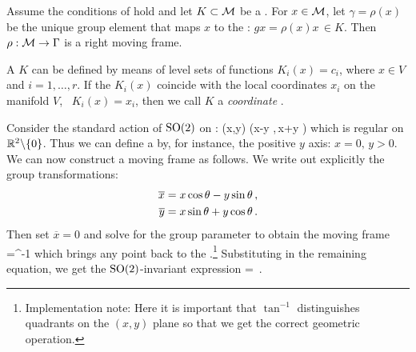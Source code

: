 \begin{theorem}
 Assume the conditions of  hold and
 let $K\subset\mathcal{M}$ be a {\csection}. For $x\in \mathcal{M}$, let
 $\gamma=\rho(x)$ be the unique group element that maps $x$
 to the {\csection}: $g x = \rho(x) x\, \in K$. Then
 $\rho:\mathcal{M}\rightarrow \Gamma$ is a right moving frame.
\end{theorem}

A {\csection} $K$ can be defined by means of level sets of
functions $K_i(x)=c_i$, where $x\in V$ and $i=1,\ldots,r$. If
the $K_i(x)$ coincide with the local coordinates $x_i$ on the
manifold $V$, \ie~$K_i(x)=x_i$, then we call $K$ a
\emph{coordinate \csection}.

\begin{example}
Consider the standard action of $\mathrm{SO}(2)$ on :
\beq
	(x,y) \mapsto (x\cos\theta -y \sin\theta,\,x\sin\theta +y \cos\theta )
\eeq
which is regular on $\mathbb{R}^{2}\backslash\{0\}$. Thus we can define
a {\csection} by, for instance, the
positive $y$ axis: $x=0,\,y>0$.
We can now construct a moving frame as follows. We write out
explicitly the group transformations:
\begin{subequations}
\begin{align}
 	\overline{x} &= x \cos\theta - y \sin\theta\label{eq:explSO2stnd1}\,, \\ 
	\overline{y} &= x \sin\theta + y \cos\theta\label{eq:explSO2stnd2}\,.
\end{align}
\end{subequations}
Then set $\overline{x}=0$ and solve  for the group
parameter to obtain the moving frame
\beq
	\theta=\tan^{-1}
	\label{eq:SO2stndMF}
\eeq
which brings any point  back to the {\csection}.\footnote{Implementation note: Here it is important that $\tan^{-1}$
distinguishes quadrants on the $(x,y)$ plane so that we get the correct geometric operation.} Substituting  in the remaining equation, we get
the $\mathrm{SO}(2)$-invariant expression
\beq
	 = \,.
\eeq
\end{example}


